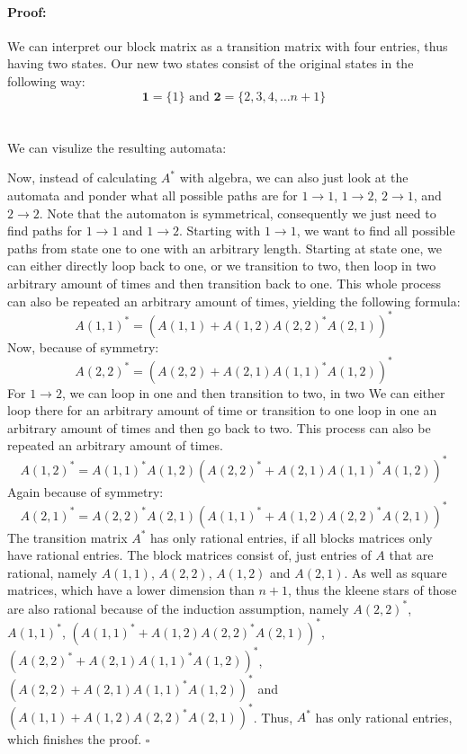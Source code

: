 \documentclass[12pt,letterpaper]{article}
\newenvironment{proof}{\paragraph{Proof:}}{\hfill$\square$}
\begin{document}
\begin{proof}
\begin{center}
\end{center}
We can interpret our block matrix as a transition matrix with four entries,
thus having two states. Our new two states consist of the original states in the following way:
\[
  \mathbf{1} = \{1\} \text{ and } \mathbf{2} = \{2,3,4, \dots n + 1\}
\]
\\
\pagebreak
\\
We can visulize the resulting automata:
\begin{center}
\end{center}
Now, instead of calculating $A^*$ with algebra, we can also just look
at the automata and ponder what all possible paths are for $1 \to 1$,
$1 \to 2$, $2 \to 1$, and $2 \to 2$. Note that the automaton is symmetrical, consequently we just need to find paths for $1 \to 1$ and $1 \to 2$.
Starting with $1 \to 1$, we want to find all possible paths from state
one to one with an arbitrary length. Starting at state one, we can either
directly loop back to one, or we transition to two, then loop in two 
arbitrary amount of times and then transition back to one. This whole
process can also be repeated an arbitrary amount of times, yielding the
following formula:
\[
  A(1,1)^* = (A(1,1) + A(1,2)A(2,2)^*A(2,1))^*
\]
Now, because of symmetry:
\[
  A(2,2)^* = (A(2,2) + A(2,1)A(1,1)^*A(1,2))^*
\]
For $1 \to 2$, we can loop in one and then transition to two, in two 
We can either loop there for an arbitrary amount of time or transition to one loop in one an arbitrary amount of times and then go back to
two. This process can also be repeated an arbitrary amount of times.
\[
  A(1,2)^* = A(1,1)^*A(1,2)(A(2,2)^* + A(2,1)A(1,1)^*A(1,2))^*
\]
Again because of symmetry:
\[
  A(2,1)^* = A(2,2)^*A(2,1)(A(1,1)^* + A(1,2)A(2,2)^*A(2,1))^*
\]
The transition matrix $A^*$ has only rational entries, if all blocks
matrices only have rational entries. The block matrices consist of, 
just entries of $A$ that are rational, namely $A(1,1)$, $A(2,2)$, $A(1,2)$
and $A(2,1)$. As well as square matrices, which have
a lower dimension than $n+1$, thus the kleene stars of those are also 
rational because of the induction assumption, namely 
$A(2,2)^*$, $A(1,1)^*$, $(A(1,1)^* + A(1,2)A(2,2)^*A(2,1))^*$, 
$(A(2,2)^* + A(2,1)A(1,1)^*A(1,2))^*$, $(A(2,2) + A(2,1)A(1,1)^*A(1,2))^*$
and $(A(1,1) + A(1,2)A(2,2)^*A(2,1))^*$. Thus, $A^*$ has only rational
entries, which finishes the proof.
\end{proof}\\
\end{document}
